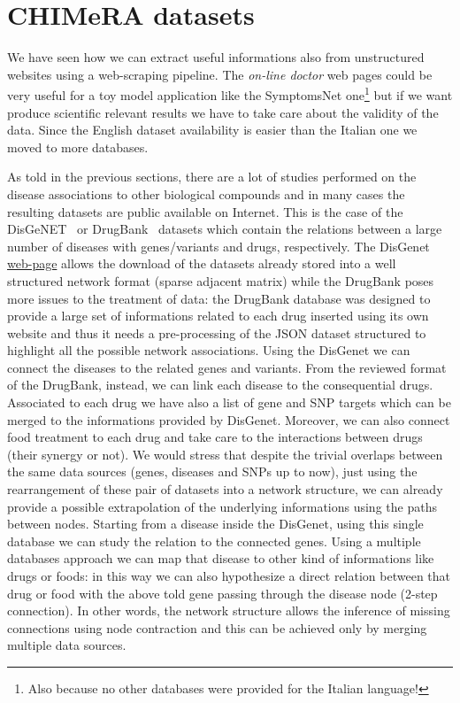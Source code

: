 \documentclass{standalone}
\begin{document}
\section[Dataset]{CHIMeRA datasets}\label{chimera:db}

We have seen how we can extract useful informations also from unstructured websites using a web-scraping pipeline.
The \emph{on-line doctor} web pages could be very useful for a toy model application like the SymptomsNet one\footnote{
  Also because no other databases were provided for the Italian language!
} but if we want produce scientific relevant results we have to take care about the validity of the data.
Since the English dataset availability is easier than the Italian one we moved to more  databases.

As told in the previous sections, there are a lot of studies performed on the disease associations to other biological compounds and in many cases the resulting datasets are public available on Internet.
This is the case of the DisGeNET~\cite{DisGeNet} or DrugBank~\cite{DrugBank} datasets which contain the relations between a large number of diseases with genes/variants and drugs, respectively.
The DisGenet \href{https://doi.org/10.1093/nar/gkw943}{web-page} allows the download of the datasets already stored into a well structured network format (sparse adjacent matrix) while the DrugBank poses more issues to the treatment of data: the DrugBank database was designed to provide a large set of informations related to each drug inserted using its own website and thus it needs a pre-processing of the JSON dataset structured to highlight all the possible network associations.
Using the DisGenet we can connect the diseases to the related genes and variants.
From the reviewed format of the DrugBank, instead, we can link each disease to the consequential drugs.
Associated to each drug we have also a list of gene and SNP targets which can be merged to the informations provided by DisGenet.
Moreover, we can also connect food treatment to each drug and take care to the interactions between drugs (their synergy or not).
We would stress that despite the trivial overlaps between the same data sources (genes, diseases and SNPs up to now), just using the rearrangement of these pair of datasets into a network structure, we can already provide a possible extrapolation of the underlying informations using the paths between nodes.
Starting from a disease inside the DisGenet, using this single database we can study the  relation to the connected genes.
Using a multiple databases approach we can map that disease to other kind of informations like drugs or foods: in this way we can also hypothesize a direct relation between that drug or food with the above told gene passing through the disease node (2-step connection).
In other words, the network structure allows the inference of missing connections using node contraction and this can be achieved only by merging multiple data sources.
\end{document}
